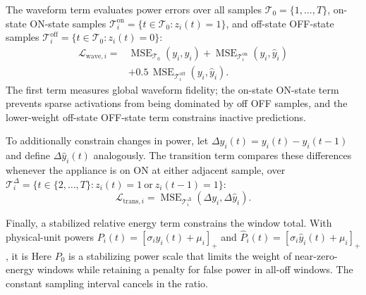 \documentclass[journal]{IEEEtran}
\providecommand{\DIFadd}[1]{{\protect\color{blue} \sf #1}} %
\providecommand{\DIFdel}[1]{{\protect\color{red} \scriptsize #1}} %
\providecommand{\DIFaddbegin}{} %
\providecommand{\DIFaddend}{} %
\providecommand{\DIFdelbegin}{} %
\providecommand{\DIFdelend}{} %
\providecommand{\DIFscaledelfig}{0.5}
\newlength{\DIFdelgraphicswidth} %
\newlength{\DIFdelgraphicsheight} %
\providecommand{\DIFaddincludegraphics}[2][]{{\color{blue}\fbox{\DIFOincludegraphics[#1]{#2}}}} %
\providecommand{\DIFdelincludegraphics}[2][]{%
\sbox{\DIFdelgraphicsbox}{\DIFOincludegraphics[#1]{#2}}%
\settoboxwidth{\DIFdelgraphicswidth}{\DIFdelgraphicsbox} %
\settoboxtotalheight{\DIFdelgraphicsheight}{\DIFdelgraphicsbox} %
\scalebox{\DIFscaledelfig}{%
\parbox[b]{\DIFdelgraphicswidth}{\usebox{\DIFdelgraphicsbox}\\[-\baselineskip] \rule{\DIFdelgraphicswidth}{0em}}\llap{\resizebox{\DIFdelgraphicswidth}{\DIFdelgraphicsheight}{%
\setlength{\unitlength}{\DIFdelgraphicswidth}%
\begin{picture}(1,1)%
\thicklines\linethickness{2pt} %
{\color[rgb]{1,0,0}\put(0,0){\framebox(1,1){}}}%
{\color[rgb]{1,0,0}\put(0,0){\line( 1,1){1}}}%
{\color[rgb]{1,0,0}\put(0,1){\line(1,-1){1}}}%
\end{picture}%
}\hspace*{3pt}}} %
} %
\DeclareRobustCommand{\DIFaddbegin}{\DIFOaddbegin \let\includegraphics\DIFaddincludegraphics} %
\DeclareRobustCommand{\DIFaddend}{\DIFOaddend \let\includegraphics\DIFOincludegraphics} %
\DeclareRobustCommand{\DIFdelbegin}{\DIFOdelbegin \let\includegraphics\DIFdelincludegraphics} %
\DeclareRobustCommand{\DIFdelend}{\DIFOaddend \let\includegraphics\DIFOincludegraphics} %
\begin{document}
The waveform term evaluates power errors over all samples $\mathcal{T}_0=\{1,\ldots,T\}$, \DIFdelbegin \DIFdel{on-state }\DIFdelend \DIFaddbegin \DIFadd{ON-state }\DIFaddend samples $\mathcal{T}^{\mathrm{on}}_i=\{t\in\mathcal{T}_0:z_i(t)=1\}$, and \DIFdelbegin \DIFdel{off-state }\DIFdelend \DIFaddbegin \DIFadd{OFF-state }\DIFaddend samples $\mathcal{T}^{\mathrm{off}}_i=\{t\in\mathcal{T}_0:z_i(t)=0\}$:
\begin{equation}
\begin{aligned}
\mathcal{L}_{\mathrm{wave},i}={}&
\operatorname{MSE}_{\mathcal{T}_0}(y_i,\hat y_i)
+\operatorname{MSE}_{\mathcal{T}^{\mathrm{on}}_i}(y_i,\hat y_i)\\
&+0.5\,\operatorname{MSE}_{\mathcal{T}^{\mathrm{off}}_i}(y_i,\hat y_i).
\end{aligned}
\label{eq:waveform-loss}
\end{equation}
The first term measures global waveform fidelity; the \DIFdelbegin \DIFdel{on-state }\DIFdelend \DIFaddbegin \DIFadd{ON-state }\DIFaddend term prevents sparse activations from being dominated by \DIFdelbegin \DIFdel{off }\DIFdelend \DIFaddbegin \DIFadd{OFF }\DIFaddend samples, and the lower-weight \DIFdelbegin \DIFdel{off-state }\DIFdelend \DIFaddbegin \DIFadd{OFF-state }\DIFaddend term constrains inactive predictions.

To additionally constrain changes in power, let $\Delta y_i(t)=y_i(t)-y_i(t-1)$ and define $\Delta\hat y_i(t)$ analogously. The transition term compares these differences whenever the appliance is \DIFdelbegin \DIFdel{on }\DIFdelend \DIFaddbegin \DIFadd{ON }\DIFaddend at either adjacent sample, over $\mathcal{T}^{\Delta}_i=\{t\in\{2,\ldots,T\}:z_i(t)=1\ \text{or}\ z_i(t-1)=1\}$:
\begin{equation}
\mathcal{L}_{\mathrm{trans},i}=
\operatorname{MSE}_{\mathcal{T}^{\Delta}_i}(\Delta y_i,\Delta\hat y_i).
\label{eq:transition-loss}
\end{equation}

\DIFdelbegin \DIFdel{Finally, a stabilized relative energy term constrains the window total. With physical-unit powers $P_i(t)=[\sigma_i y_i(t)+\mu_i]_+$ and $\hat P_i(t)=[\sigma_i\hat y_i(t)+\mu_i]_+$, it is
}%
\DIFdel{Here $P_0$ is a stabilizing power scale that limits the weight of near-zero-energy windows while retaining a penalty for false power in all-off windows. The constant sampling interval cancels in the ratio.
}%
\end{document}
